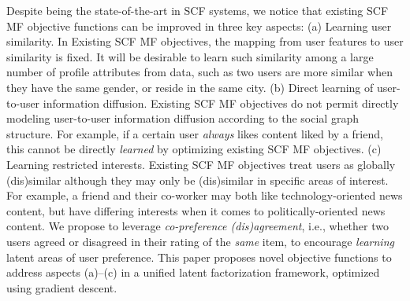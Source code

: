 Despite being the state-of-the-art in SCF systems, we notice that
existing SCF MF objective functions can be improved in three key aspects:
(a) Learning user similarity. %
In Existing SCF MF objectives, the mapping from user features 
to user similarity is fixed. It will be desirable to learn such similarity 
among a large number of profile attributes from data, 
such as two users are more similar when they have the same gender, or reside in the same city.
(b) Direct learning of user-to-user information diffusion.
Existing SCF MF objectives do not permit directly modeling
user-to-user information diffusion according to the social graph
structure.  For example, if a certain user \emph{always} likes content
liked by a friend, this cannot be directly \emph{learned}
by optimizing existing SCF MF objectives.
(c) Learning restricted interests. 
Existing SCF MF
objectives treat users as globally (dis)similar although they may only
be (dis)similar in specific areas of interest.  For example, a
friend and their co-worker may both like technology-oriented news
content, but have differing interests when it comes to
politically-oriented news content.  
We propose to leverage \emph{co-preference 
(dis)agreement}, i.e., whether two users agreed or disagreed in their
rating of the \emph{same} item, to encourage \emph{learning}
latent areas of user preference. %
This paper proposes novel objective functions to address aspects (a)--(c)
in a unified latent factorization framework, optimized using gradient descent. 

